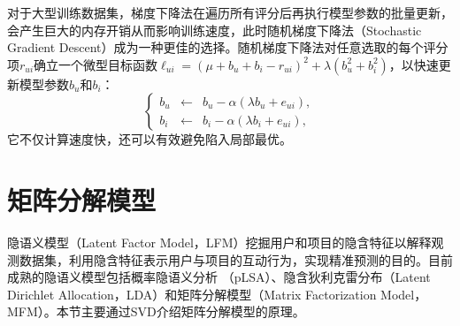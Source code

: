 对于大型训练数据集，梯度下降法在遍历所有评分后再执行模型参数的批量更新，会产生巨大的内存开销从而影响训练速度，此时随机梯度下降法（Stochastic Gradient Descent）成为一种更佳的选择。随机梯度下降法对任意选取的每个评分项$r_{ui}$确立一个微型目标函数$\ell_{ui} = (\mu + b_u + b_i - r_{ui})^2 + \lambda (b_u^2 + b_i^2)$，以快速更新模型参数$b_u$和$b_i$：
\begin{equation}
    \left\{
        \begin{array}{lcl}
            b_u & \leftarrow & b_u - \alpha (\lambda b_u + e_{ui}),\\
            b_i & \leftarrow & b_i - \alpha (\lambda b_i + e_{ui}),
        \end{array}
    \right.
\end{equation}
它不仅计算速度快，还可以有效避免陷入局部最优。

\section{矩阵分解模型}
隐语义模型（Latent Factor Model，LFM）挖掘用户和项目的隐含特征以解释观测数据集，利用隐含特征表示用户与项目的互动行为，实现精准预测的目的。目前成熟的隐语义模型包括概率隐语义分析
（pLSA）\cite{hofmann2004latent,hofmann1999probabilistic}、隐含狄利克雷分布（Latent Dirichlet Allocation，LDA）\cite{blei2003latent}和矩阵分解模型（Matrix Factorization Model，MFM）\cite{singh2008unified}。本节主要通过SVD介绍矩阵分解模型的原理。

